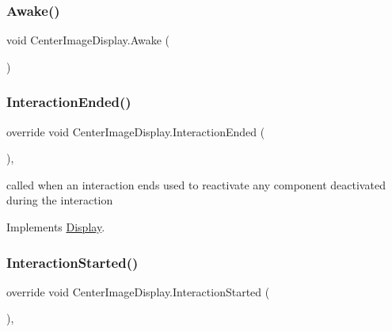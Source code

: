 \subsubsection{\texorpdfstring{Awake()}{Awake()}}
{\footnotesize\ttfamily void Center\+Image\+Display.\+Awake (\begin{DoxyParamCaption}{ }\end{DoxyParamCaption})\hspace{0.3cm}{\ttfamily [private]}}

\mbox{\label{class_center_image_display_ac78f5ea36aa445bb3d12124f1baf814d}} 
\subsubsection{\texorpdfstring{Interaction\+Ended()}{InteractionEnded()}}
{\footnotesize\ttfamily override void Center\+Image\+Display.\+Interaction\+Ended (\begin{DoxyParamCaption}{ }\end{DoxyParamCaption})\hspace{0.3cm}{\ttfamily [protected]}, {\ttfamily [virtual]}}



called when an interaction ends used to reactivate any component deactivated during the interaction 



Implements \mbox{\hyperlink{class_display_a6fd38485267e1b78f1d1dfb589ec4ae0}{Display}}.

\mbox{\label{class_center_image_display_a2944541a38bcc65b7fff15200c9f0fc3}} 
\subsubsection{\texorpdfstring{Interaction\+Started()}{InteractionStarted()}}
{\footnotesize\ttfamily override void Center\+Image\+Display.\+Interaction\+Started (\begin{DoxyParamCaption}{ }\end{DoxyParamCaption})\hspace{0.3cm}{\ttfamily [protected]}, {\ttfamily [virtual]}}



